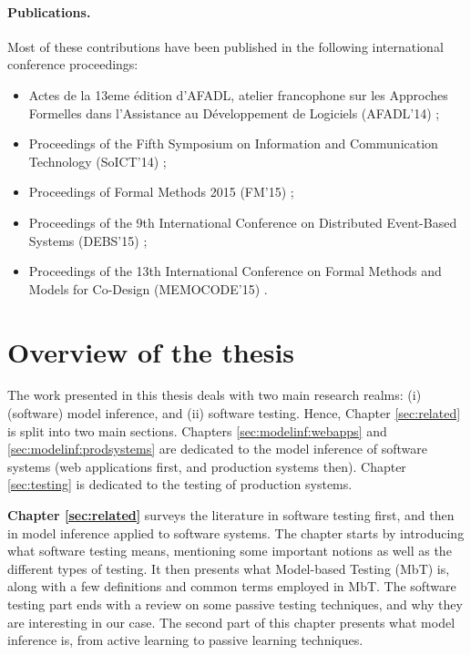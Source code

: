 \paragraph{Publications.} Most of these contributions have been
published in the following international conference proceedings:

\begin{itemize}
    \item Actes de la 13eme {\'e}dition d’AFADL, atelier
        francophone sur les Approches Formelles dans l’Assistance au
        D{\'e}veloppement de Logiciels (AFADL'14)
        \cite{durand2014inference};

    \item Proceedings of the Fifth Symposium on Information and
        Communication Technology (SoICT'14)
        \cite{DBLP:conf/soict/DurandS14};

    \item Proceedings of Formal Methods 2015 (FM'15)
        \cite{DBLP:conf/fm/DurandS15};

    \item Proceedings of the 9th International Conference on
        Distributed Event-Based Systems (DEBS'15)
        \cite{DBLP:conf/debs/SalvaD15};

    \item Proceedings of the 13th International Conference on Formal
        Methods and Models for Co-Design (MEMOCODE'15)
        \cite{7340480}.
\end{itemize}


\section{Overview of the thesis}
\label{sec:intro:overview}

The work presented in this thesis deals with two main research
realms: (i) (software) model inference, and (ii) software
testing. Hence, Chapter \ref{sec:related} is split into two main
sections. Chapters \ref{sec:modelinf:webapps} and
\ref{sec:modelinf:prodsystems} are dedicated to the model
inference of software systems (web applications first, and
production systems then). Chapter \ref{sec:testing} is dedicated
to the testing of production systems.

\textbf{Chapter \ref{sec:related}} surveys the literature in
software testing first, and then in model inference applied to
software systems. The chapter starts by introducing what software
testing means, mentioning some important notions as well as the
different types of testing. It then presents what Model-based
Testing (MbT) is, along with a few definitions and common terms
employed in MbT. The software testing part ends with a review on
some passive testing techniques, and why they are interesting in
our case. The second part of this chapter presents what model
inference is, from active learning to passive learning
techniques.

